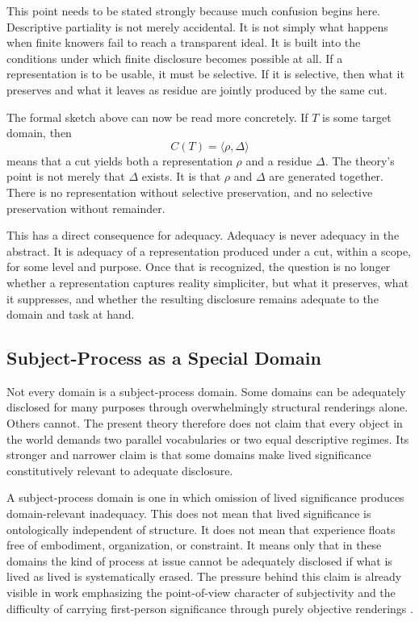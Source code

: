 \documentclass[11pt]{article}
\begin{document}
This point needs to be stated strongly because much confusion begins here. Descriptive partiality is not merely accidental. It is not simply what happens when finite knowers fail to reach a transparent ideal. It is built into the conditions under which finite disclosure becomes possible at all. If a representation is to be usable, it must be selective. If it is selective, then what it preserves and what it leaves as residue are jointly produced by the same cut.

The formal sketch above can now be read more concretely. If \(T\) is some target domain, then
\[
C(T)=\langle \rho,\Delta \rangle
\]
means that a cut yields both a representation \(\rho\) and a residue \(\Delta\). The theory's point is not merely that \(\Delta\) exists. It is that \(\rho\) and \(\Delta\) are generated together. There is no representation without selective preservation, and no selective preservation without remainder.

This has a direct consequence for adequacy. Adequacy is never adequacy in the abstract. It is adequacy of a representation produced under a cut, within a scope, for some level and purpose. Once that is recognized, the question is no longer whether a representation captures reality simpliciter, but what it preserves, what it suppresses, and whether the resulting disclosure remains adequate to the domain and task at hand.

\subsection{Subject-Process as a Special Domain}

Not every domain is a subject-process domain. Some domains can be adequately disclosed for many purposes through overwhelmingly structural renderings alone. Others cannot. The present theory therefore does not claim that every object in the world demands two parallel vocabularies or two equal descriptive regimes. Its stronger and narrower claim is that some domains make lived significance constitutively relevant to adequate disclosure.

A subject-process domain is one in which omission of lived significance produces domain-relevant inadequacy. This does not mean that lived significance is ontologically independent of structure. It does not mean that experience floats free of embodiment, organization, or constraint. It means only that in these domains the kind of process at issue cannot be adequately disclosed if what is lived as lived is systematically erased. The pressure behind this claim is already visible in work emphasizing the point-of-view character of subjectivity and the difficulty of carrying first-person significance through purely objective renderings \cite{Nagel1974,Levine1983,Chalmers1995}.
\end{document}
